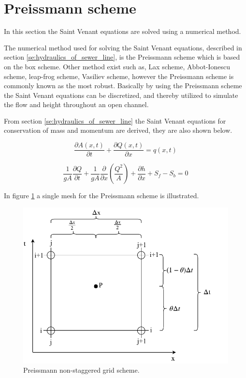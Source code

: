 ﻿\section{Preissmann scheme}\label{subse:preissmann_scheme}
In this section the Saint Venant equations are solved using a numerical method.


The numerical method used for solving the Saint Venant equations, described in section \ref{se:hydraulics_of_sewer_line}, is the Preissmann scheme which is based on the box scheme. Other method exist such as, Lax scheme, Abbot-Ionescu scheme, leap-frog scheme, Vasiliev scheme, however the Preissmann scheme is commonly known as the most robust. Basically by using the Preissmann scheme the Saint Venant equations can be discretized, and thereby utilized to simulate the flow and height throughout an open channel.

From section \ref{se:hydraulics_of_sewer_line} the Saint Venant equations for conservation of mass and momentum are derived, they are also shown below.

\begin{equation}\label{eq:saintbernard_mass_preiss}
\frac{\partial A(x,t)}{\partial t} + \frac{\partial Q(x,t)}{\partial x}=q(x,t)
\end{equation}

\begin{equation}\label{eq:saintbernard_momentum_preiss}
\frac{1}{gA} \frac{\partial Q}{\partial t} +\frac{1}{gA}\frac{\partial}{\partial x} \left( \frac{Q^2}{A} \right) + \frac{\partial h}{\partial x} + S_f - S_b = 0
\end{equation}


In figure \ref{fig:preissmann_grid_scheme} a single mesh for the Preissmann scheme is illustrated.

\begin{figure}[H]
\centering
\includegraphics[width=.6\textwidth]{report/simulation/pictures/preissmann_scheme}
\caption{Preissmann non-staggered grid scheme.}
\label{fig:preissmann_grid_scheme}
\end{figure}

